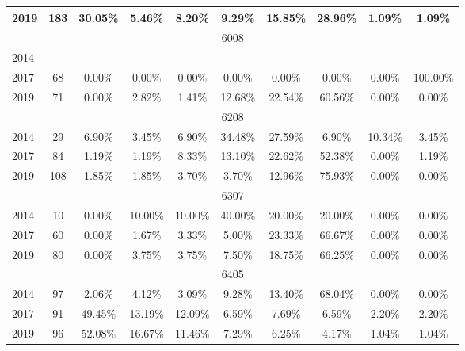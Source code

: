 \begin{table}[H]
\begin{tabular}{|l|c|ccc|ccc|cc|}
2019 & 183 & 30.05\% & 5.46\% & 8.20\% & 9.29\% & 15.85\% & 28.96\% & 1.09\% & 1.09\%\\
\hline
\hline
\multicolumn{10}{|c|}{6008}\\
\hline
2014 & & & & & & & & & \\
2017 & 68 & 0.00\% & 0.00\% & 0.00\% & 0.00\% & 0.00\% & 0.00\% & 0.00\% & 100.00\%\\
2019 & 71 & 0.00\% & 2.82\% & 1.41\% & 12.68\% & 22.54\% & 60.56\% & 0.00\% & 0.00\%\\
\hline
\hline
\multicolumn{10}{|c|}{6208}\\
\hline
2014 & 29 & 6.90\% & 3.45\% & 6.90\% & 34.48\% & 27.59\% & 6.90\% & 10.34\% & 3.45\%\\
2017 & 84 & 1.19\% & 1.19\% & 8.33\% & 13.10\% & 22.62\% & 52.38\% & 0.00\% & 1.19\%\\
2019 & 108 & 1.85\% & 1.85\% & 3.70\% & 3.70\% & 12.96\% & 75.93\% & 0.00\% & 0.00\%\\
\hline
\hline
\multicolumn{10}{|c|}{6307}\\
\hline
2014 & 10 & 0.00\% & 10.00\% & 10.00\% & 40.00\% & 20.00\% & 20.00\% & 0.00\% & 0.00\%\\
2017 & 60 & 0.00\% & 1.67\% & 3.33\% & 5.00\% & 23.33\% & 66.67\% & 0.00\% & 0.00\%\\
2019 & 80 & 0.00\% & 3.75\% & 3.75\% & 7.50\% & 18.75\% & 66.25\% & 0.00\% & 0.00\%\\
\hline
\hline
\multicolumn{10}{|c|}{6405}\\
\hline
2014 & 97 & 2.06\% & 4.12\% & 3.09\% & 9.28\% & 13.40\% & 68.04\% & 0.00\% & 0.00\%\\
2017 & 91 & 49.45\% & 13.19\% & 12.09\% & 6.59\% & 7.69\% & 6.59\% & 2.20\% & 2.20\%\\
2019 & 96 & 52.08\% & 16.67\% & 11.46\% & 7.29\% & 6.25\% & 4.17\% & 1.04\% & 1.04\%\\
\hline
\bottomrule
\end{tabular}
\end{table}
